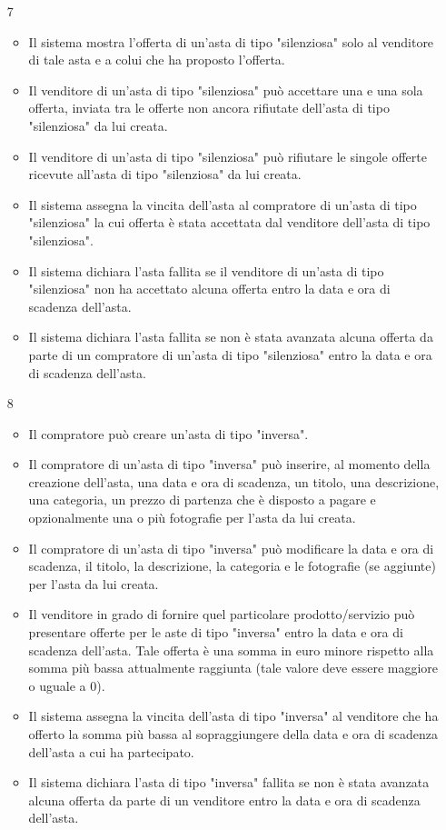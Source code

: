 \begin{itemize}
            \item[7] 
                \begin{itemize}
                    \item Il sistema mostra l'offerta di un'asta di tipo "silenziosa" solo al venditore di tale asta e a colui che ha proposto l'offerta.
                    \item Il venditore di un'asta di tipo "silenziosa" può accettare una e una sola offerta, inviata tra le offerte non ancora rifiutate dell'asta di tipo "silenziosa" da lui creata.
                    \item Il venditore di un'asta di tipo "silenziosa" può rifiutare le singole offerte ricevute all'asta di tipo "silenziosa" da lui creata.
                    \item Il sistema assegna la vincita dell'asta al compratore di un'asta di tipo "silenziosa" la cui offerta è stata accettata dal venditore dell'asta di tipo "silenziosa".
                    \item Il sistema dichiara l'asta fallita se il venditore di un'asta di tipo "silenziosa" non ha accettato alcuna offerta entro la data e ora di scadenza dell'asta.
                    \item Il sistema dichiara l'asta fallita se non è stata avanzata alcuna offerta da parte di un compratore di un'asta di tipo "silenziosa" entro la data e ora di scadenza dell'asta.
                \end{itemize}
            \item[8]
                \begin{itemize}            
                    \item Il compratore può creare un'asta di tipo "inversa".
                    \item Il compratore di un'asta di tipo "inversa" può inserire, al momento della creazione dell'asta, una data e ora di scadenza, un titolo, una descrizione, una categoria, un prezzo di partenza che è disposto a pagare e opzionalmente una o più fotografie per l'asta da lui creata.
                    \item Il compratore di un'asta di tipo "inversa" può modificare la data e ora di scadenza, il titolo, la descrizione, la categoria e le fotografie (se aggiunte) per l'asta da lui creata.
                    \item Il venditore in grado di fornire quel particolare prodotto/servizio può presentare offerte per le aste di tipo "inversa" entro la data e ora di scadenza dell'asta. Tale offerta è una somma in euro minore rispetto alla somma più bassa attualmente raggiunta (tale valore deve essere maggiore o uguale a 0).
                    \item Il sistema assegna la vincita dell'asta di tipo "inversa" al venditore che ha offerto la somma più bassa al sopraggiungere della data e ora di scadenza dell'asta a cui ha partecipato.
                    \item Il sistema dichiara l'asta di tipo "inversa" fallita se non è stata avanzata alcuna offerta da parte di un venditore entro la data e ora di scadenza dell'asta.
                \end{itemize}
        \end{itemize}